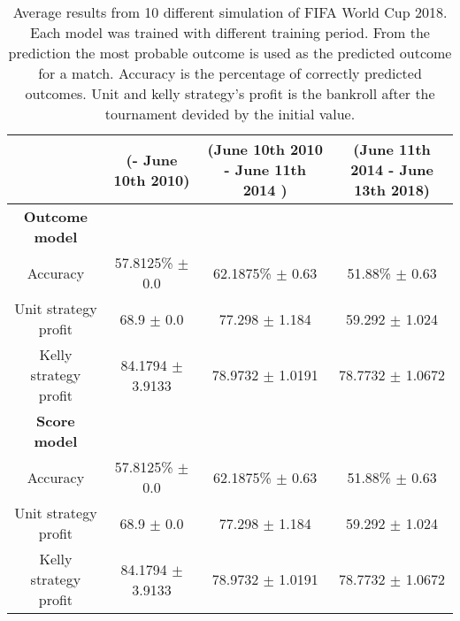 \begin{sidewaystable}
    \caption{Average results from 10 different simulation of FIFA World Cup 2018. Each model was trained with different training period. From the prediction the most probable outcome is used as the predicted outcome for a match. Accuracy is the percentage of correctly predicted outcomes. Unit and kelly strategy's profit is the bankroll after the tournament devided by the initial value.}
    \begin{tabular}{ | c |c| c | c |}
    \hline
    & (- June 10th 2010) & (June 10th 2010 - June 11th 2014 ) & (June 11th 2014 - June 13th 2018) \\
    \hline
    \textbf{Outcome model} \\
    \hline
    Accuracy & 57.8125\% $\pm$ 0.0 & 62.1875\% $\pm$ 0.63 & 51.88\% $\pm$ 0.63 \\
    Unit strategy profit& 68.9 $\pm$ 0.0 & 77.298 $\pm$ 1.184 & 59.292 $\pm$ 1.024 \\
    Kelly strategy profit& 84.1794 $\pm$ 3.9133 & 78.9732 $\pm$ 1.0191 & 78.7732 $\pm$ 1.0672 \\
    \hline
    \textbf{Score model} \\
    \hline
    Accuracy & 57.8125\% $\pm$ 0.0 & 62.1875\% $\pm$ 0.63 & 51.88\% $\pm$ 0.63 \\
    Unit strategy profit& 68.9 $\pm$ 0.0 & 77.298 $\pm$ 1.184 & 59.292 $\pm$ 1.024 \\
    Kelly strategy profit& 84.1794 $\pm$ 3.9133 & 78.9732 $\pm$ 1.0191 & 78.7732 $\pm$ 1.0672 \\
    \hline
   \end{tabular}
\end{sidewaystable}